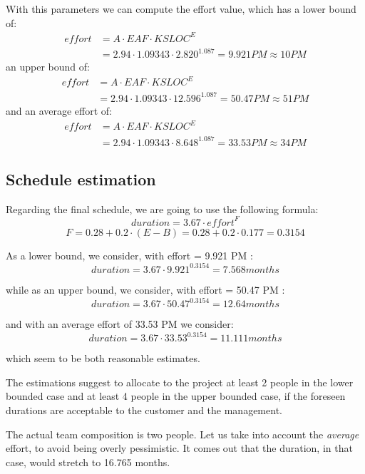 \documentclass{scrreprt}
\begin{document}
With this parameters we can compute the effort value, which has a lower bound of:
\[
\begin{split}
	\mathit{effort} &= A \cdot \mathit{EAF} \cdot \mathit{KSLOC}^E \\
	&= 2.94 \cdot 1.09343 \cdot 2.820^{1.087} = 9.921 PM \approx 10 PM
\end{split}
\]
an upper bound of:
\[
\begin{split}
	\mathit{effort} &= A \cdot \mathit{EAF} \cdot \mathit{KSLOC}^E \\
	&= 2.94 \cdot 1.09343 \cdot 12.596^{1.087} = 50.47 PM \approx 51 PM
\end{split}
\]
and an average effort of:
\[
\begin{split}
	\mathit{effort} &= A \cdot \mathit{EAF} \cdot \mathit{KSLOC}^E \\
	&= 2.94 \cdot 1.09343 \cdot 8.648^{1.087} = 33.53 PM \approx 34 PM
\end{split}
\]



\subsection{Schedule estimation}
Regarding the final schedule, we are going to use the following formula:
\[
	\mathit{duration} = 3.67 \cdot \mathit{effort}^F
\]
\[
	F = 0.28 + 0.2 \cdot (E - B) = 0.28 + 0.2 \cdot 0.177 = 0.3154
\]

As a lower bound, we consider, with effort = 9.921 PM :
\[	
	\mathit{duration} = 3.67 \cdot 9.921^{0.3154} = 7.568 \mathit{ months}
\]

while as an upper bound, we consider, with effort = 50.47 PM :
\[
	\mathit{duration} = 3.67 \cdot 50.47^{0.3154} = 12.64 \mathit{ months}
\]

and with an average effort of 33.53 PM we consider:
\[
	\mathit{duration} = 3.67 \cdot 33.53^{0.3154} = 11.111 \mathit{ months}
\]

which seem to be both reasonable estimates.

The estimations suggest to allocate to the project at least 2 people in the lower bounded case and at least 4 people in the upper bounded case, if the foreseen durations are acceptable to the customer and the management.

The actual team composition is two people. Let us take into account the \emph{average} effort, to avoid being overly pessimistic. It comes out that the duration, in that case, would stretch to 16.765 months.
\end{document}

